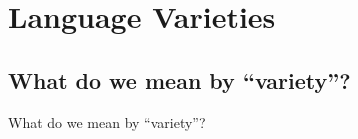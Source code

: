 \documentclass{beamer}
\newcommand{\subtwoone}{What do we mean by ``variety''?}
\begin{document}
  \section{Language Varieties}
    \subsection{\subtwoone}
      \begin{frame}{\subtwoone}
        
      \end{frame}

\end{document}
